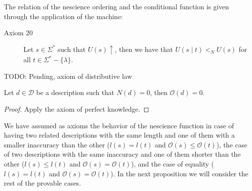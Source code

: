 \vskip 0.25cm

The relation of the nescience ordering and the conditional function is given through the application of the machine:

\begin{description}
\item[Axiom 20] Let $s \in \Sigma^\ast$ such that $U(s) \uparrow$, then we have that $U(s \mid t) <_N U(s)$ for all $t \in \Sigma^\ast-\{\lambda\}$.
\end{description}

{\color{red} TODO: Pending, axiom of distributive law}

\begin{proposition}
Let $d \in \mathcal{D}$ be a description such that $N(d)=0$, then $\mathcal{O}(d)=0$.
\end{proposition}
\begin{proof}
Apply the axiom of perfect knowledge.
\end{proof}

We have assumed as axioms the behavior of the nescience function in case of having two related descriptions with the same length and one of them with a smaller inaccuracy than the other ($l(s) = l(t)$ and $\mathcal{O} (s) \leq \mathcal{O} (t)$), the case of two descriptions with the same inaccuracy and one of them shorter than the other ($l(s) \leq l(t)$ and $\mathcal{O} (s) = \mathcal{O} (t)$), and the case of equality ($l(s) = l(t)$ and $\mathcal{O} (s) = \mathcal{O} (t)$). In the next proposition we will consider the rest of the provable cases.

